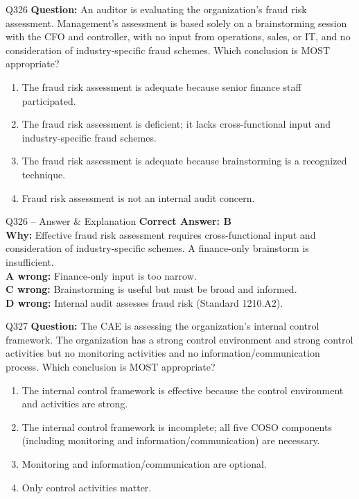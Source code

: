 \documentclass[aspectratio=169,10pt]{beamer}
\begin{document}
	\begin{frame}[t]{Q326}
		\small
		\textbf{Question:} An auditor is evaluating the organization's fraud risk assessment. Management's assessment is based solely on a brainstorming session with the CFO and controller, with no input from operations, sales, or IT, and no consideration of industry-specific fraud schemes. Which conclusion is MOST appropriate?
		\begin{enumerate}[label=\Alph*.,itemsep=1pt,topsep=2pt]
			\item The fraud risk assessment is adequate because senior finance staff participated.
			\item The fraud risk assessment is deficient; it lacks cross-functional input and industry-specific fraud schemes.
			\item The fraud risk assessment is adequate because brainstorming is a recognized technique.
			\item Fraud risk assessment is not an internal audit concern.
		\end{enumerate}
	\end{frame}
	
	\begin{frame}[t]{Q326 -- Answer \& Explanation}
		\small
		\textbf{Correct Answer: B} \\[4pt]
		\textbf{Why:} Effective fraud risk assessment requires cross-functional input and consideration of industry-specific schemes. A finance-only brainstorm is insufficient. \\[4pt]
		\textbf{A wrong:} Finance-only input is too narrow. \\[2pt]
		\textbf{C wrong:} Brainstorming is useful but must be broad and informed. \\[2pt]
		\textbf{D wrong:} Internal audit assesses fraud risk (Standard 1210.A2).
	\end{frame}
	
	\begin{frame}[t]{Q327}
		\small
		\textbf{Question:} The CAE is assessing the organization's internal control framework. The organization has a strong control environment and strong control activities but no monitoring activities and no information/communication process. Which conclusion is MOST appropriate?
		\begin{enumerate}[label=\Alph*.,itemsep=1pt,topsep=2pt]
			\item The internal control framework is effective because the control environment and activities are strong.
			\item The internal control framework is incomplete; all five COSO components (including monitoring and information/communication) are necessary.
			\item Monitoring and information/communication are optional.
			\item Only control activities matter.
		\end{enumerate}
	\end{frame}
	
\end{document}
